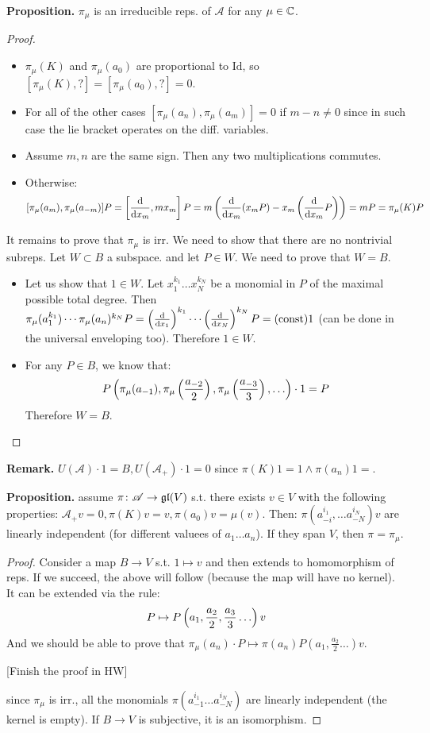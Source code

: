 \documentclass[]{../../../../tex/classes/styledArticle}
\newcommand\gl {\mathfrak{gl}}
\newcommand\asc{\mathscr{A}}
\begin{document}
	\textbf{Proposition. }$\pi_\mu$ is an irreducible reps. of $\asc$ for any $\mu \in \mathbb{C}$. \begin{proof}
		\begin{itemize}
			First of all we need to prove that this is indeed a reps.
			\item  $\pi_\mu(K)$ and $\pi_\mu(a_0)$ are proportional to $\mathrm{Id}$, so $[\pi_\mu(K), ? ] = [\pi_\mu(a_0), ?] = 0$. 
			\item 		For all of the other cases $[\pi_\mu(a_n), \pi_\mu(a_m)] = 0$ if $m - n \neq 0$ since in such case the lie bracket operates on the diff. variables. 
			\item Assume $m, n$ are the same sign. Then any two multiplications commutes. 
			\item Otherwise: 
			\[ [\pi_\mu(a_m), \pi_\mu(a_{-m})]P = \left [ \frac{\mathrm{d}}{\mathrm{d} x_m}, mx_m \right ]P = m\left ( \frac{\mathrm{d}}{\mathrm{d} x_m}(x_m P) - x_m\left ( \frac{\mathrm{d}}{\mathrm{d} x_m}P \right ) \right ) = mP = \pi_\mu(K)P \]
		\end{itemize}
		It remains to prove that $\pi_\mu$ is irr. We need to show that there are no nontrivial subreps. Let $W \subset B$ a subspace. and let $P \in W$. We need to prove that $W = B$. 
		\begin{itemize}
			\item Let us show that $1 \in W$. Let $x_1^{k_1} \dots x_N^{k_N}$ be a monomial in $P$ of the maximal possible total degree. Then $\pi_\mu(a_1^{k_1}) \cdots \pi_\mu(a_n)^{k_N} P = \left ( \frac{\mathrm{d}}{\mathrm{d} x_1} \right )^{k_1} \cdots \left ( \frac{\mathrm{d}}{\mathrm{d} x_N} \right )^{k_N}P = (\text{const}) 1$ (can be done in the universal enveloping too). Therefore $1 \in W$. 
			\item For any $P \in B$, we know that: 
			\[ P\cl{\pi_{\mu}(a_{-1}), \pi_{\mu}\cl{\frac{a_{-2}}{2}}, \pi_\mu\cl{\frac{a_{-3}}{3}}, \dots} \cdot 1 = P \]
			Therefore $W = B$. 
		\end{itemize}
	\end{proof}

	\textbf{Remark. }$U(\asc) \cdot 1 = B, U(\asc_+) \cdot 1 = 0$ since $\pi(K) 1 = 1 \land \pi(a_n)1 = $. 
	
	\textbf{Proposition. }assume $\pi \co \asc \to \gl(V)$ s.t. there exists $v \in V $ with the following properties: $\asc_+v = 0, \pi(K)v = v, \pi(a_0)v = \mu (v)$. Then: $\pi(a_{-i}^{i_1}, \dots a_{-N}^{i_N})v$ are linearly independent (for different valuees of $a_1 \dots a_n$). If they span $V$, then $\pi = \pi_\mu$. \begin{proof}
		Consider a map $B \to V$ s.t. $1 \mapsto v$ and then extends to homomorphism of reps. If we succeed, the above will follow (because the map will have no kernel). It can be extended via the rule: 
		\[ P \mapsto P\cl{a_1, \frac{a_2}{2}, \frac{a_3}{3} \dots }v \]
		And we should be able to prove that $\pi_\mu(a_n) \cdot P \mapsto \pi(a_n)P(a_1, \frac{a_2}{2} \dots )v$. 
		
		[Finish the proof in HW]
		
		since $\pi_\mu$ is irr., all the monomials $\pi(a_{-1}^{i_1} \dots a_{-N}^{i_N})$ are linearly independent (the kernel is empty). If $B \to V$ is subjective, it is an isomorphism. 
	\end{proof}
	
\end{document}

